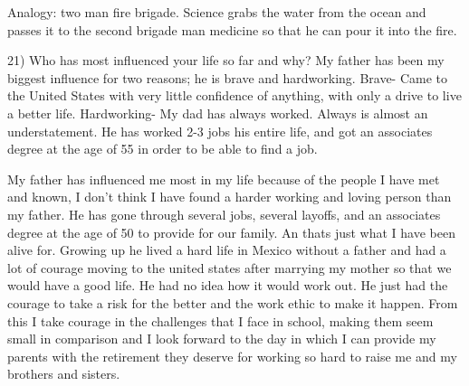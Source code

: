 \documentclass[12pt,a4paper,article]{memoir} %
\begin{document}
Analogy: two man fire brigade.  Science grabs the water from the ocean and passes it to the second brigade man medicine so that he can pour it into the fire. 

21) Who has most influenced your life so far and why?
My father has been my biggest influence for two reasons; he is brave and hardworking.
Brave- Came to the United States with very little confidence of anything, with only a drive to live a better life.
Hardworking- My dad has always worked.  Always is almost an understatement.  He has worked 2-3 jobs his entire life, and got an associates degree at the age of 55 in order to be able to find a job.  



My father has influenced me most in my life because of the people I have met and known, I don't think I have found a harder working and loving person than my father.  He has gone through several jobs, several layoffs, and an associates degree at the age of 50 to provide for our family.  An thats just what I have been alive for.  Growing up he lived a hard life in Mexico without a father and had a lot of courage moving to the united states after marrying my mother so that we would have a good life.  He had no idea how it would work out.  He just had the courage to take a risk for the better and the work ethic to make it happen.  
From this I take courage in the challenges that I face in school, making them seem small in comparison and I look forward to the day in which I can provide my parents with the retirement they deserve for working so hard to raise me and my brothers and sisters.  



\chapter{}


\chapter{}
\section{}
\subsection{}

\chapter{}
\section{}
\subsection{}
\end{document}
